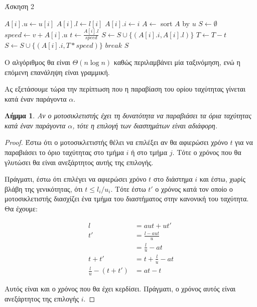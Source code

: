 \documentclass[11pt,a4paper]{book}
\newtheorem*{lemma}{Λήμμα}
\begin{document}
\begin{algorithm}[H]
\caption{\textgreek{Άσκηση 2}}
\begin{algorithmic}[1]
		\State $A[ i ].u \gets u[ i ]$
		\State $A[ i ].l \gets l[ i ]$
		\State $A[ i ].i \gets i$
	\EndFor
	\State $A \gets $ sort $A$ by $u$
	\State $S \gets \emptyset$
		\State $speed \gets v + A[ i ].u$
		\State $t \gets \frac{A[ i ].l}{speed}$
			\State $S \gets S \cup \{ ( A[ i ].i, A[ i ].l ) \}$
			\State $T \gets T - t$
		\Else
			\State $S \gets S \cup \{ ( A[ i ].i, T * speed ) \}$
			\State $break$
		\EndIf
	\EndFor
	\State \Return $S$
\EndProcedure
\end{algorithmic}
\end{algorithm}

Ο αλγόριθμος θα είναι $\Theta( n \log{n} )$ καθώς περιλαμβάνει μία ταξινόμηση, ενώ η επόμενη επανάληψη είναι γραμμική.

Ας εξετάσουμε τώρα την περίπτωση που η παραβίαση του ορίου ταχύτητας γίνεται κατά έναν παράγοντα $\alpha$.

\begin{lemma}
Αν ο μοτοσικλετιστής έχει τη δυνατότητα να παραβιάσει τα όρια ταχύτητας κατά έναν παράγοντα $\alpha$, τότε η επιλογή των διαστημάτων είναι αδιάφορη.
\end{lemma}
\begin{proof}
Έστω ότι ο μοτοσικλετιστής θέλει να επιλέξει αν θα αφιερώσει χρόνο $t$ για να παραβιάσει το όριο ταχύτητας στο τμήμα $i$ ή στο τμήμα $j$. Τότε ο χρόνος που θα γλυτώσει θα είναι ανεξάρτητος αυτής της επιλογής.

Πράγματι, έστω ότι επιλέγει να αφιερώσει χρόνο $t$ στο διάστημα $i$ και έστω, χωρίς βλάβη της γενικότητας, ότι $t \leq l_i / u_i$. Τότε έστω $t'$ ο χρόνος κατά τον οποίο ο μοτοσικλετιστής διασχίζει ένα τμήμα του διαστήματος στην κανονική του ταχύτητα. Θα έχουμε:

\begin{align*}
 l &= aut + ut'\\
t' &= \frac{l - aut}{u}\\
   &= \frac{l}{u} - at\\
t + t' &= t + \frac{l}{u} - at\\
\frac{l}{u} - (t + t') &= at - t
\end{align*}

Αυτός είναι και ο χρόνος που θα έχει κερδίσει. Πράγματι, ο χρόνος αυτός είναι ανεξάρτητος της επιλογής $i$.
\end{proof}
\end{document}
